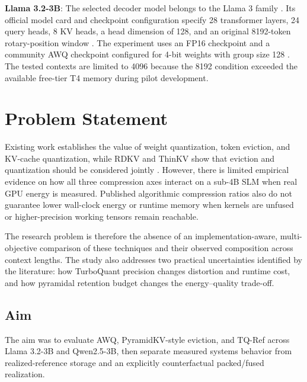 \documentclass[conference]{IEEEtran}
\begin{document}
\textbf{Llama 3.2-3B}: The selected decoder model belongs to the Llama 3 family \cite{grattafiori_llama3_2024}. Its official model card and checkpoint configuration specify 28 transformer layers, 24 query heads, 8 KV heads, a head dimension of 128, and an original 8192-token rotary-position window \cite{meta_llama32_2024}. The experiment uses an FP16 checkpoint and a community AWQ checkpoint configured for 4-bit weights with group size 128 \cite{casperhansen_llama32_awq}. The tested contexts are limited to 4096 because the 8192 condition exceeded the available free-tier T4 memory during pilot development.


\section{Problem Statement}

Existing work establishes the value of weight quantization, token eviction, and KV-cache quantization, while RDKV and ThinKV show that eviction and quantization should be considered jointly \cite{zhang_rdkv_2026,ramachandran_thinkv_2026}. However, there is limited empirical evidence on how all three compression axes interact on a sub-4B SLM when real GPU energy is measured. Published algorithmic compression ratios also do not guarantee lower wall-clock energy or runtime memory when kernels are unfused or higher-precision working tensors remain reachable.

The research problem is therefore the absence of an implementation-aware, multi-objective comparison of these techniques and their observed composition across context lengths. The study also addresses two practical uncertainties identified by the literature: how TurboQuant precision changes distortion and runtime cost, and how pyramidal retention budget changes the energy--quality trade-off.

\subsection{Aim}

The aim was to evaluate AWQ, PyramidKV-style eviction, and TQ-Ref across Llama 3.2-3B and Qwen2.5-3B, then separate measured systems behavior from realized-reference storage and an explicitly counterfactual packed/fused realization.
\end{document}
